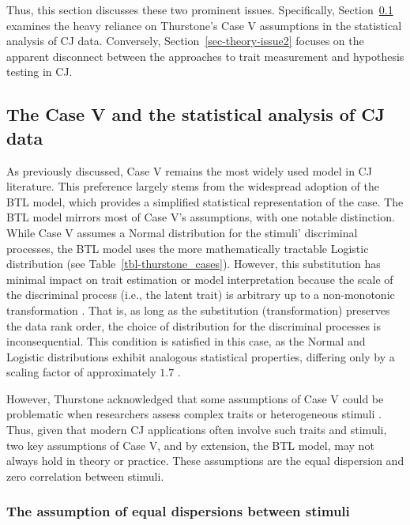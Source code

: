 \documentclass[
  authoryear,
  review,
  1p]{elsarticle}
\begin{document}
Thus, this section discusses these two prominent issues. Specifically,
Section~\ref{sec-theory-issue1} examines the heavy reliance on
Thurstone's Case V assumptions in the statistical analysis of CJ data.
Conversely, Section~\ref{sec-theory-issue2} focuses on the apparent
disconnect between the approaches to trait measurement and hypothesis
testing in CJ.

\subsection{The Case V and the statistical analysis of CJ
data}\label{sec-theory-issue1}

As previously discussed, Case V remains the most widely used model in CJ
literature. This preference largely stems from the widespread adoption
of the BTL model, which provides a simplified statistical representation
of the case. The BTL model mirrors most of Case V's assumptions, with
one notable distinction. While Case V assumes a Normal distribution for
the stimuli' discriminal processes, the BTL model uses the more
mathematically tractable Logistic distribution
\citep{Andrich_1978, Bramley_2008} (see
Table~\ref{tbl-thurstone_cases}). However, this substitution has minimal
impact on trait estimation or model interpretation because the scale of
the discriminal process (i.e., the latent trait) is arbitrary up to a
non-monotonic transformation
\citep{vanderLinden_et_al_2017_I, McElreath_2021}. That is, as long as
the substitution (transformation) preserves the data rank order, the
choice of distribution for the discriminal processes is inconsequential.
This condition is satisfied in this case, as the Normal and Logistic
distributions exhibit analogous statistical properties, differing only
by a scaling factor of approximately \(1.7\)
\citep{vanderLinden_et_al_2017_I}.

However, Thurstone acknowledged that some assumptions of Case V could be
problematic when researchers assess complex traits or heterogeneous
stimuli \citep{Thurstone_1927a}. Thus, given that modern CJ applications
often involve such traits and stimuli, two key assumptions of Case V,
and by extension, the BTL model, may not always hold in theory or
practice. These assumptions are the equal dispersion and zero
correlation between stimuli.

\subsubsection{The assumption of equal dispersions between
stimuli}\label{sec-theory-issue1a}
\end{document}
